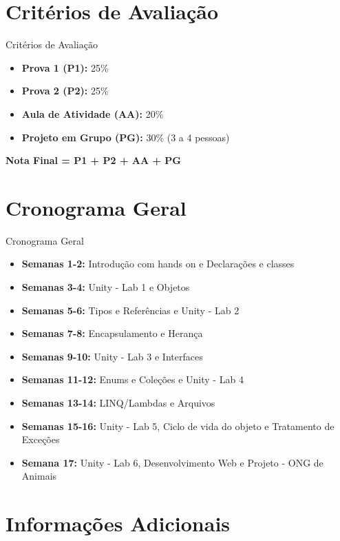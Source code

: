 \documentclass[aspectratio=169]{beamer}
\begin{document}
\section{Critérios de Avaliação}

\begin{frame}{Critérios de Avaliação}
\begin{itemize}
    \item \textbf{Prova 1 (P1):} 25\%
    \item \textbf{Prova 2 (P2):} 25\%
    \item \textbf{Aula de Atividade (AA):} 20\%
    \item \textbf{Projeto em Grupo (PG):} 30\% (3 a 4 pessoas)
\end{itemize}

\vspace{0.5cm}
\textbf{Nota Final = P1 + P2 + AA + PG}
\end{frame}

\section{Cronograma Geral}

\begin{frame}{Cronograma Geral}
\begin{itemize}
    \item \textbf{Semanas 1-2:} Introdução com hands on e Declarações e classes
    \item \textbf{Semanas 3-4:} Unity - Lab 1 e Objetos
    \item \textbf{Semanas 5-6:} Tipos e Referências e Unity - Lab 2
    \item \textbf{Semanas 7-8:} Encapsulamento e Herança
    \item \textbf{Semanas 9-10:} Unity - Lab 3 e Interfaces
    \item \textbf{Semanas 11-12:} Enums e Coleções e Unity - Lab 4
    \item \textbf{Semanas 13-14:} LINQ/Lambdas e Arquivos
    \item \textbf{Semanas 15-16:} Unity - Lab 5, Ciclo de vida do objeto e Tratamento de Exceções
    \item \textbf{Semana 17:} Unity - Lab 6, Desenvolvimento Web e Projeto - ONG de Animais
\end{itemize}
\end{frame}

\section{Informações Adicionais}
\end{document}
